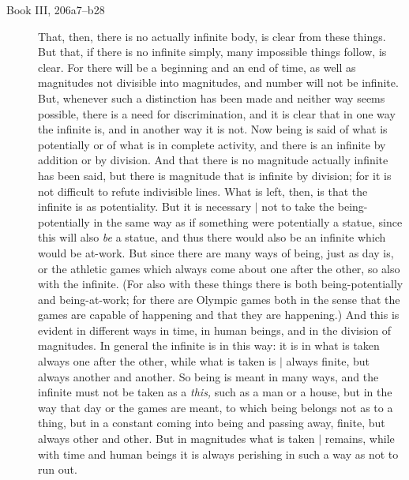\documentclass[twoside,openright]{article}
\begin{document}
\begin{description}

\item[Book III, 206a7--b28] That, then, there is no actually infinite
  body, is clear from these things.  But that, if there is no infinite
  simply, many impossible things follow, is clear.  For there will be
  a beginning and an end of time, as well as magnitudes not divisible
  into magnitudes, and number will not be infinite.  But, whenever
  such a distinction has been made and neither way seems possible,
  there is a need for discrimination, and it is clear that in one way
  the infinite is, and in another way it is not.  Now being is said of
  what is potentially or of what is in complete activity, and there is
  an infinite by addition or by division.  And that there is no
  magnitude actually infinite has been said, but there is magnitude
  that is infinite by division; for it is not difficult to refute
  indivisible lines.  What is left, then, is that the infinite is as
  potentiality.  But it is necessary $|$ not to
  take the being-potentially in the same way as if something were
  potentially a statue, since this will also \emph{be} a statue, and
  thus there would also be an infinite which would be at-work.  But
  since there are many ways of being, just as day is, or the athletic
  games which always come about one after the other, so also with the
  infinite. (For also with these things there is both
  being-potentially and being-at-work; for there are Olympic games
  both in the sense that the games are capable of happening and that
  they are happening.)  And this is evident in different ways in time,
  in human beings, and in the division of magnitudes. In general the
  infinite is in this way: it is in what is taken always one after the
  other, while what is taken is $|$ always finite,
  but always another and another.  So being is meant in many ways, and
  the infinite must not be taken as a \emph{this,} such as a man or a
  house, but in the way that day or the games are meant, to which
  being belongs not as to a thing, but in a constant coming into being
  and passing away, finite, but always other and other.  But in
  magnitudes what is taken $|$ remains, while with
  time and human beings it is always perishing in such a way as not to
  run out.


\end{description}
\end{document}
